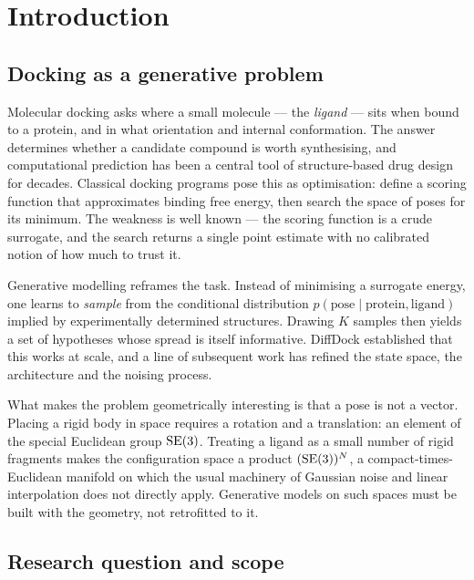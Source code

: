 \chapter{Introduction}
\label{ch:intro}

\section{Docking as a generative problem}

Molecular docking asks where a small molecule --- the \emph{ligand} --- sits
when bound to a protein, and in what orientation and internal conformation.
The answer determines whether a candidate compound is worth synthesising, and
computational prediction has been a central tool of structure-based drug
design for decades. Classical docking programs pose this as optimisation:
define a scoring function that approximates binding free energy, then search
the space of poses for its minimum. The weakness is well known --- the scoring
function is a crude surrogate, and the search returns a single point estimate
with no calibrated notion of how much to trust it.

Generative modelling reframes the task. Instead of minimising a surrogate
energy, one learns to \emph{sample} from the conditional distribution
$p(\text{pose} \mid \text{protein}, \text{ligand})$ implied by experimentally
determined structures. Drawing $K$ samples then yields a set of hypotheses
whose spread is itself informative. DiffDock \citep{corso2023diffdock}
established that this works at scale, and a line of subsequent work has
refined the state space, the architecture and the noising process.

What makes the problem geometrically interesting is that a pose is not a
vector. Placing a rigid body in space requires a rotation and a translation:
an element of the special Euclidean group $\mathrm{SE}(3)$. Treating a ligand as a
small number of rigid fragments makes the configuration space a product
$(\mathrm{SE}(3))^N$, a compact-times-Euclidean manifold on which the usual
machinery of Gaussian noise and linear interpolation does not directly apply.
Generative models on such spaces must be built with the geometry, not
retrofitted to it.

\section{Research question and scope}

